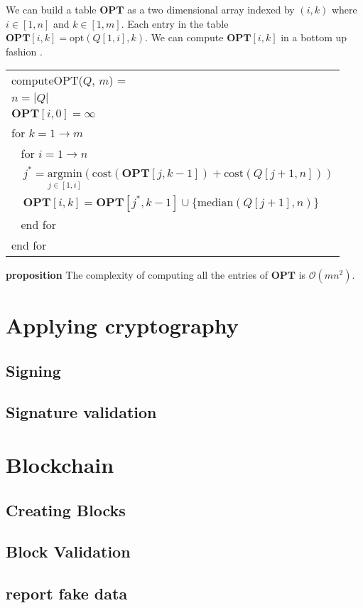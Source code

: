 We can build a table $\mathbf{OPT}$ as a two dimensional array
indexed by $(i, k)$ where $i\in [1, n]$ and $k\in [1, m]$.  Each entry
in the table $\mathbf{OPT}[i,k] = \mathrm{opt}(Q[1,i], k)$.
We can compute $\mathbf{OPT}[i,k]$ in a bottom up fashion \cite{}.

\vspace{1em}
{\small
	\begin{tabular}{|l|} \hline
		computeOPT($Q$, $m$) = \\
		\verb|| $n = |Q|$ \\
		\verb|| $\mathbf{OPT}[i, 0] = \infty$ \\
		\verb|| for $k = 1 \to m$ \\
		\verb| | for $i = 1 \to n$ \\
		\verb|  | $j^* = \underset{j\in[1,i]}{\mathrm{argmin}}
		(\mathrm{cost}(\mathbf{OPT}[j,k-1]) + \mathrm{cost}(Q[j+1, n]))$ \\
		\verb|  | $\mathbf{OPT}[i,k] = \mathbf{OPT}[j^*, k-1] \cup \{\mathrm{median}(Q[j+1], n)\}$ \\
		\verb| | end for \\
		\verb|| end for \\ \hline
	\end{tabular}
}
\vspace{1em}

\textbf{proposition} The complexity of computing all the entries of $\mathbf{OPT}$ is $\mathcal{O}(mn^2)$.


\section{Applying cryptography}
\subsection{Signing}
\subsection{Signature validation}
\section{Blockchain}
\subsection{Creating Blocks}
\subsection{Block Validation}
\subsection{report fake data}

